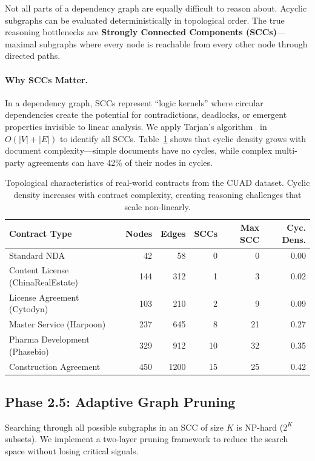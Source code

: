 \documentclass{article}
\begin{document}
Not all parts of a dependency graph are equally difficult to reason about. Acyclic subgraphs can be evaluated deterministically in topological order. The true reasoning bottlenecks are \textbf{Strongly Connected Components (SCCs)}---maximal subgraphs where every node is reachable from every other node through directed paths.

\paragraph{Why SCCs Matter.} In a dependency graph, SCCs represent ``logic kernels'' where circular dependencies create the potential for contradictions, deadlocks, or emergent properties invisible to linear analysis. We apply Tarjan's algorithm~\cite{tarjan} in $O(|V| + |E|)$ to identify all SCCs. Table~\ref{tab:topology} shows that cyclic density grows with document complexity---simple documents have no cycles, while complex multi-party agreements can have 42\% of their nodes in cycles.

\begin{table}[t]
\caption{Topological characteristics of real-world contracts from the CUAD dataset. Cyclic density increases with contract complexity, creating reasoning challenges that scale non-linearly.}
\label{tab:topology}
\centering
\small
\begin{tabular}{lrrrrr}
\toprule
\textbf{Contract Type} & \textbf{Nodes} & \textbf{Edges} & \textbf{SCCs} & \textbf{Max SCC} & \textbf{Cyc. Dens.} \\
\midrule
Standard NDA & 42 & 58 & 0 & 0 & 0.00 \\
Content License (ChinaRealEstate) & 144 & 312 & 1 & 3 & 0.02 \\
License Agreement (Cytodyn) & 103 & 210 & 2 & 9 & 0.09 \\
Master Service (Harpoon) & 237 & 645 & 8 & 21 & 0.27 \\
Pharma Development (Phasebio) & 329 & 912 & 10 & 32 & 0.35 \\
Construction Agreement & 450 & 1200 & 15 & 25 & 0.42 \\
\bottomrule
\end{tabular}
\end{table}

\subsection{Phase 2.5: Adaptive Graph Pruning}
\label{sec:pruning}

Searching through all possible subgraphs in an SCC of size $K$ is NP-hard ($2^K$ subsets). We implement a two-layer pruning framework to reduce the search space without losing critical signals.
\end{document}
